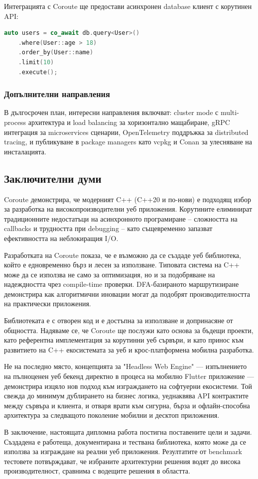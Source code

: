 Интеграцията с Coroute ще предостави асинхронен database клиент с корутинен API:
\begin{lstlisting}[language=C++, basicstyle=\small\ttfamily]
auto users = co_await db.query<User>()
    .where(User::age > 18)
    .order_by(User::name)
    .limit(10)
    .execute();
\end{lstlisting}

\subsubsection{Допълнителни направления}

В дългосрочен план, интересни направления включват: cluster mode с multi-process архитектура и load balancing за хоризонтално мащабиране, gRPC интеграция за microservices сценарии, OpenTelemetry поддръжка за distributed tracing, и публикуване в package managers като vcpkg и Conan за улесняване на инсталацията.

\subsection{Заключителни думи}

Coroute демонстрира, че модерният C++ (C++20 и по-нови) е подходящ избор за разработка на високопроизводителни уеб приложения. Корутините елиминират традиционните недостатъци на асинхронното програмиране -- сложността на callbacks и трудността при debugging -- като същевременно запазват ефективността на неблокиращия I/O.

Разработката на Coroute показа, че е възможно да се създаде уеб библиотека, който е едновременно бърз и лесен за използване. Типовата система на C++ може да се използва не само за оптимизация, но и за подобряване на надеждността чрез compile-time проверки. DFA-базираното маршрутизиране демонстрира как алгоритмични иновации могат да подобрят производителността на практически приложения.

Библиотеката е с отворен код и е достъпна за използване и допринасяне от общността. Надяваме се, че Coroute ще послужи като основа за бъдещи проекти, като референтна имплементация за корутинни уеб сървъри, и като принос към развитието на C++ екосистемата за уеб и крос-платформена мобилна разработка.

Не на последно място, концепцията за "Headless Web Engine" --- изпълнението на пълноценен уеб бекенд директно в процеса на мобилно Flutter приложение --- демонстрира изцяло нов подход към изграждането на софтуерни екосистеми. Той свежда до минимум дублирането на бизнес логика, уеднаквява API контрактите между сървъра и клиента, и отваря врати към сигурна, бърза и офлайн-способна архитектура за следващото поколение мобилни и десктоп приложения.

В заключение, настоящата дипломна работа постигна поставените цели и задачи. Създадена е работеща, документирана и тествана библиотека, която може да се използва за изграждане на реални уеб приложения. Резултатите от benchmark тестовете потвърждават, че избраните архитектурни решения водят до висока производителност, сравнима с водещите решения в областта.
